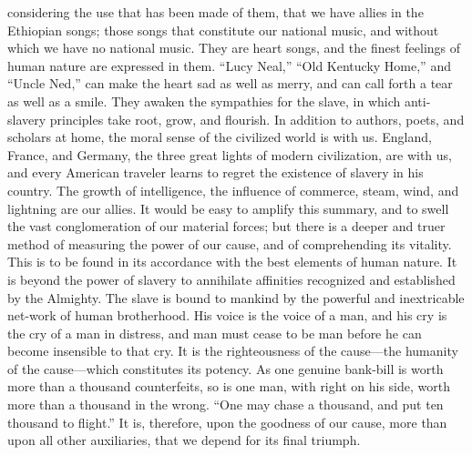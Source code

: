 considering the use that has been made of them, that we have allies in
the Ethiopian songs; those songs that constitute our national music, and
without which we have no national music. They are heart songs, and the
finest feelings of human nature are expressed in them. ``Lucy Neal,''
``Old Kentucky Home,'' and ``Uncle Ned,'' can make the heart sad as well
as merry, and can call forth a tear as well as a smile. They awaken the
sympathies for the slave, in which anti-slavery principles take root,
grow, and flourish. In addition to authors, poets, and scholars at home,
the moral sense of the civilized world is with us. England, France, and
Germany, the three great lights of modern civilization, are with us, and
every American traveler learns to regret the existence of slavery in his
country. The growth of intelligence, the influence of commerce, steam,
wind, and lightning are our allies. It would be easy to amplify this
summary, and to swell the vast conglomeration of our material forces;
but there is a deeper and truer method of measuring the power of our
cause, and of comprehending its vitality. This is to be found in its
accordance with the best elements of human nature. It is beyond the
power of slavery to annihilate affinities recognized and established by
the Almighty. The slave is bound to mankind by the powerful and
inextricable net-work of human brotherhood. His {}voice is the voice of
a man, and his cry is the cry of a man in distress, and man must cease
to be man before he can become insensible to that cry. It is the
righteousness of the cause---the humanity of the cause---which
constitutes its potency. As one genuine bank-bill is worth more than a
thousand counterfeits, so is one man, with right on his side, worth more
than a thousand in the wrong. ``One may chase a thousand, and put ten
thousand to flight.'' It is, therefore, upon the goodness of our cause,
more than upon all other auxiliaries, that we depend for its final
triumph.

